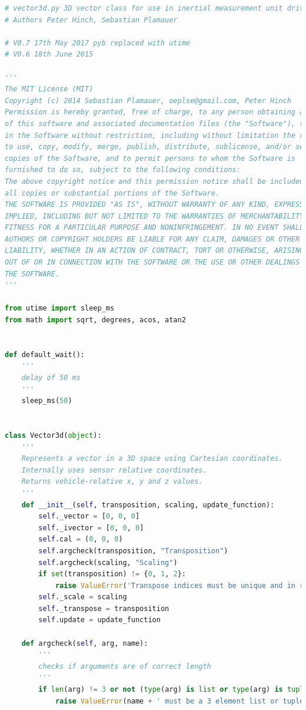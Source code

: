 \documentclass[conference]{IEEEtran}
\begin{document}
    \begin{lstlisting}[language=Python, caption=IMU Library, label=imu_library]
# vector3d.py 3D vector class for use in inertial measurement unit drivers
# Authors Peter Hinch, Sebastian Plamauer

# V0.7 17th May 2017 pyb replaced with utime
# V0.6 18th June 2015

'''
The MIT License (MIT)
Copyright (c) 2014 Sebastian Plamauer, oeplse@gmail.com, Peter Hinch
Permission is hereby granted, free of charge, to any person obtaining a copy
of this software and associated documentation files (the "Software"), to deal
in the Software without restriction, including without limitation the rights
to use, copy, modify, merge, publish, distribute, sublicense, and/or sell
copies of the Software, and to permit persons to whom the Software is
furnished to do so, subject to the following conditions:
The above copyright notice and this permission notice shall be included in
all copies or substantial portions of the Software.
THE SOFTWARE IS PROVIDED "AS IS", WITHOUT WARRANTY OF ANY KIND, EXPRESS OR
IMPLIED, INCLUDING BUT NOT LIMITED TO THE WARRANTIES OF MERCHANTABILITY,
FITNESS FOR A PARTICULAR PURPOSE AND NONINFRINGEMENT. IN NO EVENT SHALL THE
AUTHORS OR COPYRIGHT HOLDERS BE LIABLE FOR ANY CLAIM, DAMAGES OR OTHER
LIABILITY, WHETHER IN AN ACTION OF CONTRACT, TORT OR OTHERWISE, ARISING FROM,
OUT OF OR IN CONNECTION WITH THE SOFTWARE OR THE USE OR OTHER DEALINGS IN
THE SOFTWARE.
'''

from utime import sleep_ms
from math import sqrt, degrees, acos, atan2


def default_wait():
    '''
    delay of 50 ms
    '''
    sleep_ms(50)


class Vector3d(object):
    '''
    Represents a vector in a 3D space using Cartesian coordinates.
    Internally uses sensor relative coordinates.
    Returns vehicle-relative x, y and z values.
    '''
    def __init__(self, transposition, scaling, update_function):
        self._vector = [0, 0, 0]
        self._ivector = [0, 0, 0]
        self.cal = (0, 0, 0)
        self.argcheck(transposition, "Transposition")
        self.argcheck(scaling, "Scaling")
        if set(transposition) != {0, 1, 2}:
            raise ValueError('Transpose indices must be unique and in range 0-2')
        self._scale = scaling
        self._transpose = transposition
        self.update = update_function

    def argcheck(self, arg, name):
        '''
        checks if arguments are of correct length
        '''
        if len(arg) != 3 or not (type(arg) is list or type(arg) is tuple):
            raise ValueError(name + ' must be a 3 element list or tuple')


\end{lstlisting}
\end{document}
